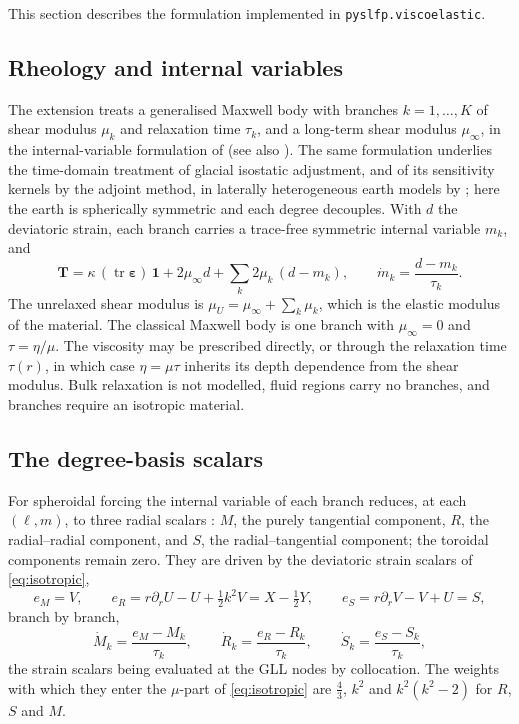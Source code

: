 \documentclass[11pt,a4paper]{article}
\numberwithin{equation}{section}
\begin{document}
This section describes the formulation implemented in
\texttt{pyslfp.viscoelastic}.

\subsection{Rheology and internal variables}

The extension treats a generalised Maxwell body with branches
$k=1,\dots,K$ of shear modulus $\mu_{k}$ and relaxation time $\tau_{k}$, and a
long-term shear modulus $\mu_{\infty}$, in the internal-variable formulation of
\citet{AlAttarTromp2014} (see also \citealp{CrawfordEtAl2017}). The same
formulation underlies the time-domain treatment of glacial isostatic adjustment,
and of its sensitivity kernels by the adjoint method, in laterally
heterogeneous earth models by \citet{CrawfordEtAl2018}; here the earth is
spherically symmetric and each degree decouples. With $d$ the
deviatoric strain, each branch carries a trace-free symmetric internal variable
$m_{k}$, and
\begin{equation}
\mathbf{T} = \kappa\,(\operatorname{tr}\bm{\varepsilon})\,\mathbf{1}
 + 2\mu_{\infty}d + \sum_{k}2\mu_{k}\,(d-m_{k}),\qquad
\dot m_{k} = \frac{d-m_{k}}{\tau_{k}}.
\label{eq:maxwell}
\end{equation}
The unrelaxed shear modulus is $\mu_{U}=\mu_{\infty}+\sum_{k}\mu_{k}$, which is
the elastic modulus of the material. The classical Maxwell body is one branch
with $\mu_{\infty}=0$ and $\tau=\eta/\mu$. The viscosity may be prescribed
directly, or through the relaxation time $\tau(r)$, in which case
$\eta=\mu\tau$ inherits its depth dependence from the shear modulus. Bulk
relaxation is not modelled, fluid regions carry no branches, and branches
require an isotropic material.

\subsection{The degree-basis scalars}

For spheroidal forcing the internal variable of each branch reduces, at each
$(\ell,m)$, to three radial scalars \citep[eqs D68--D73]{AlAttarTromp2014}: $M$,
the purely tangential component, $R$, the radial--radial component, and $S$,
the radial--tangential component; the toroidal components remain zero. They are
driven by the deviatoric strain scalars of \eqref{eq:isotropic},
\begin{equation}
e_{M} = V,\qquad
e_{R} = r\partial_{r}U - U + \tfrac12 k^{2}V = X-\tfrac12 Y,\qquad
e_{S} = r\partial_{r}V - V + U = S,
\end{equation}
branch by branch,
\begin{equation}
\dot M_{k} = \frac{e_{M}-M_{k}}{\tau_{k}},\qquad
\dot R_{k} = \frac{e_{R}-R_{k}}{\tau_{k}},\qquad
\dot S_{k} = \frac{e_{S}-S_{k}}{\tau_{k}},
\end{equation}
the strain scalars being evaluated at the GLL nodes by collocation. The weights
with which they enter the $\mu$-part of \eqref{eq:isotropic} are $\tfrac43$,
$k^{2}$ and $k^{2}(k^{2}-2)$ for $R$, $S$ and $M$.
\end{document}
